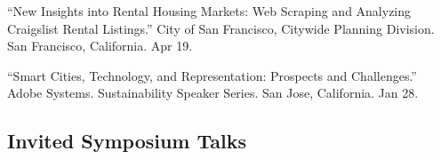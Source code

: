 \documentclass[11pt,letterpaper]{report} %
\begin{document}
\begin{tablist}
\item[2016] \tab{}\enquote{New Insights into Rental Housing Markets: Web Scraping and Analyzing Craigslist Rental Listings.} City of San Francisco, Citywide Planning Division. San Francisco, California. Apr 19.

\item[2016] \tab{}\enquote{Smart Cities, Technology, and Representation: Prospects and Challenges.} Adobe Systems. Sustainability Speaker Series. San Jose, California. Jan 28.

\end{tablist}

\subsection*{Invited Symposium Talks}
\end{document}
